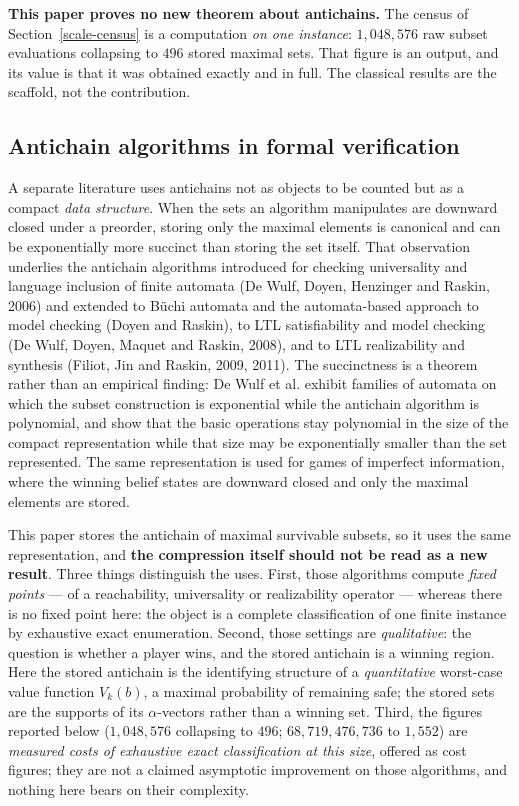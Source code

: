 \documentclass[10pt,twocolumn]{article}
\theoremstyle{plain}
\theoremstyle{definition}
\theoremstyle{remark}
\begin{document}
\textbf{This paper proves no new theorem about antichains.} The census of
Section~\ref{scale-census} is a computation \emph{on one instance}: \(1{,}048{,}576\) raw subset
evaluations collapsing to \(496\) stored maximal sets. That figure is an output, and its
value is that it was obtained exactly and in full. The classical results are the scaffold,
not the contribution.

\subsection{Antichain algorithms in formal verification}

A separate literature uses antichains not as objects to be counted but as a compact
\emph{data structure}. When the sets an algorithm manipulates are downward closed under a
preorder, storing only the maximal elements is canonical and can be exponentially more succinct
than storing the set itself. That observation underlies the antichain algorithms introduced for
checking universality and language inclusion of finite automata (De Wulf, Doyen, Henzinger and
Raskin, 2006) and extended to B\"uchi automata and the automata-based approach to model
checking (Doyen and Raskin), to LTL satisfiability and model checking (De Wulf, Doyen, Maquet
and Raskin, 2008), and to LTL realizability and synthesis (Filiot, Jin and Raskin, 2009, 2011).
The succinctness is a theorem rather than an empirical finding: De Wulf et al. exhibit families
of automata on which the subset construction is exponential while the antichain algorithm is
polynomial, and show that the basic operations stay polynomial in the size of the compact
representation while that size may be exponentially smaller than the set represented. The same
representation is used for games of imperfect information, where the winning belief states are
downward closed and only the maximal elements are stored.

This paper stores the antichain of maximal survivable subsets, so it uses the same
representation, and \textbf{the compression itself should not be read as a new result}. Three
things distinguish the uses. First, those algorithms compute \emph{fixed points} --- of a
reachability, universality or realizability operator --- whereas there is no fixed point here:
the object is a complete classification of one finite instance by exhaustive exact enumeration.
Second, those settings are \emph{qualitative}: the question is whether a player wins, and the
stored antichain is a winning region. Here the stored antichain is the identifying structure of
a \emph{quantitative} worst-case value function \(V_k(b)\), a maximal probability of remaining
safe; the stored sets are the supports of its \(\alpha\)-vectors rather than a winning set.
Third, the figures reported below (\(1{,}048{,}576\) collapsing to \(496\);
\(68{,}719{,}476{,}736\) to \(1{,}552\)) are \emph{measured costs of exhaustive exact
classification at this size}, offered as cost figures; they are not a claimed asymptotic
improvement on those algorithms, and nothing here bears on their complexity.
\end{document}
